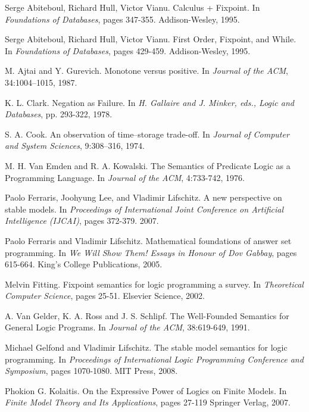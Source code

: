 \documentclass[11pt]{article}
\begin{document}
\begin{thebibliography}{16}
  Serge Abiteboul, Richard Hull, Victor Vianu.
  Calculus + Fixpoint.
  In \textit{Foundations of Databases}, pages 347-355.
  Addison-Wesley, 1995.

  Serge Abiteboul, Richard Hull, Victor Vianu.
  First Order, Fixpoint, and While.
  In \textit{Foundations of Databases}, pages 429-459.
  Addison-Wesley, 1995.

  M. Ajtai and Y. Gurevich. 
  Monotone versus positive. 
  In \textit{Journal of the ACM}, 34:1004–1015, 1987.

  K. L. Clark.
  Negation as Failure.
  In \textit{H. Gallaire and J. Minker, eds., Logic and Databases}, pp. 293-322, 1978.

  S. A. Cook. 
  An observation of time–storage trade-off. 
  In \textit{Journal of Computer and System Sciences}, 9:308–316, 1974.

  M. H. Van Emden and R. A. Kowalski.
  The Semantics of Predicate Logic as a Programming Language.
  In \textit{Journal of the ACM}, 4:733-742, 1976.

  Paolo Ferraris, Joohyung Lee, and Vladimir Lifschitz. 
  A new perspective on stable models.  
  In \textit{Proceedings of International Joint Conference on Artificial Intelligence (IJCAI)}, pages 372-379. 
  2007.

  Paolo Ferraris and Vladimir Lifschitz. 
  Mathematical foundations of answer set programming.  
  In \textit{We Will Show Them! Essays in Honour of Dov Gabbay}, pages 615-664. 
  King's College Publications, 2005.

  Melvin Fitting. 
  Fixpoint semantics for logic programming a survey. 
  In \textit{Theoretical Computer Science}, pages 25-51. Elsevier Science, 2002.

  A. Van Gelder, K. A. Ross and J. S. Schlipf.
  The Well-Founded Semantics for General Logic Programs.
  In \textit{Journal of the ACM}, 38:619-649, 1991.

  Michael Gelfond and Vladimir Lifschitz. 
  The stable model semantics for logic programming.  
  In \textit{Proceedings of International Logic Programming Conference and Symposium}, pages 1070-1080. 
  MIT Press, 2008.

  Phokion G. Kolaitis.
  On the Expressive Power of Logics on Finite Models.
  In \textit{Finite Model Theory and Its Applications}, pages 27-119
  Springer Verlag, 2007.


\end{thebibliography}
\end{document}
